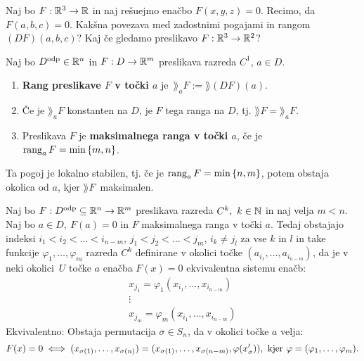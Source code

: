 \begin{zgled}
    Naj bo $F: \mathbb{R}^3 \to \mathbb{R}$ in naj rešuejmo enačbo $F(x,y,z) = 0$. Recimo, da $F(a,b,c) = 0$. Kakšna povezava med zadostnimi pogajami in rangom $(DF)(a,b,c)$? Kaj če gledamo preslikavo $F: \mathbb{R}^3 \to \mathbb{R}^2$?
\end{zgled}

\begin{definicija}
    Naj bo $D^\text{odp} \in \mathbb{R}^n$ in $F: D \to \mathbb{R}^m$ preslikava razreda $C^1$, $a \in D$. 
    \begin{enumerate}
        \item \textbf{Rang preslikave $F$ v točki $a$} je~$\rang_aF := \rang (DF)(a)$.
        \item Če je $\rang_aF$ konstanten na $D$, je $F$ tega ranga na $D$, tj. $\rang F = \rang_aF$.
        \item Preslikava $F$ je \textbf{maksimalnega ranga v točki $a$}, če je $\operatorname{rang}_aF = \min \left\{m, n\right\}$.
    \end{enumerate}      
\end{definicija}


\begin{opomba}
    Ta pogoj je lokalno stabilen, tj. če je $\operatorname{rang}_aF = \min \left\{n, m\right\}$, potem obstaja okolica od $a$, kjer $\rang F$~maksimalen.
\end{opomba}

\newpage
\begin{posledica}
    Naj bo $F: D^\text{odp} \subseteq \mathbb{R}^n \to \mathbb{R}^m$ preslikava razreda $C^k, \ k \in \mathbb{N}$ in naj velja $m < n$. Naj bo $a \in D, \ F(a) = 0$ in $F$ maksimalnega ranga v točki $a$. Tedaj obstajajo indeksi $i_1 < i_2 < \ldots < i_{n-m}$, $j_1 < j_2 < \ldots <j_m$, $i_k \neq j_l$ za vse $k$ in $l$ in take funkcije $\varphi_1, \ldots, \varphi_m$ razreda $C^k$ definirane v okolici točke $(a_{i_1}, \ldots, a_{i_{n-m}})$, da je v neki okolici~$U$ točke $a$ enačba $F(x) = 0$ ekvivalentna sistemu enačb: 
    \begin{align*}
        x_{j_1} = \varphi_1(x_{i_1}, \ldots, x_{i_{n-m}}) \\
        \vdots \\
        x_{j_m} = \varphi_m(x_{i_1}, \ldots, x_{i_{n-m}})
    \end{align*}
    Ekvivalentno: Obstaja permutacija $\sigma \in S_n$, da v okolici točke $a$ velja:
    $$F(x) = 0 \iff (x_{\sigma(1)}, \ldots, x_{\sigma(n)}) = (x_{\sigma(1)}, \ldots, x_{\sigma(n-m)}, \varphi(x_\sigma')), \text{ kjer } \varphi = (\varphi_1, \ldots, \varphi_m).$$
\end{posledica}


